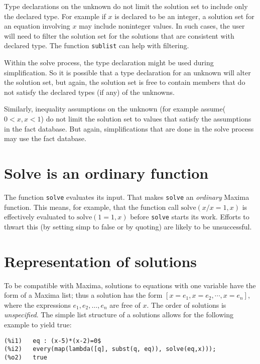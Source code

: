 \documentclass[]{scrartcl}
\newcommand{\solve}{\texttt{solve}}
\begin{document}
Type declarations on the unknown do not limit the solution set to include only the declared type. For
example if \(x\) is declared to be an integer, a solution set for an equation involving \(x\) may include
noninteger values. In such cases, the user will need to filter the solution set for the solutions that are
consistent with declared type. The function \texttt{sublist} can help with filtering.

Within the solve process, the type declaration might be used during simplification. So it is possible
that a type declaration for an unknown will alter the solution set, but again, the solution set is free
to contain members that do not satisfy the declared types (if any) of the unknowns.

Similarly, inequality assumptions on the unknown (for example assume( \(0 < x, x < 1\)) do not limit the solution set to values that satisfy the assumptions in the fact database. But again, simplifications that are done in the solve process may use the fact database.

\section{Solve is an ordinary function}

The function \solve \/ evaluates its input. That makes \solve \/ an \emph{ordinary} Maxima function. This means, for example, that the function call \(\mathrm{solve}(x/x=1,x)\) is effectively evaluated to
\(\mathrm{solve}(1=1,x)\) before \solve \/ starts its work. Efforts to thwart this (by setting simp to
false or by quoting) are likely to be unsuccessful.

\section{Representation of solutions}

To be compatible with Maxima, solutions to equations with one variable have the form of a Maxima list; thus a solution has the form \([x = e_1, x = e_2, \cdots, x = e_n]\), where the expressions \(e_1, e_2, \dots, e_n\) are free of \(x\). The order of solutions is \emph{unspecified}. The simple list structure of a solutions allows for the following example to yield true:

\begin{verbatim}
(%i1)	eq : (x-5)*(x-2)=0$
(%i2)	every(map(lambda([q], subst(q, eq)), solve(eq,x)));
(%o2)	true
\end{verbatim}
\end{document}
